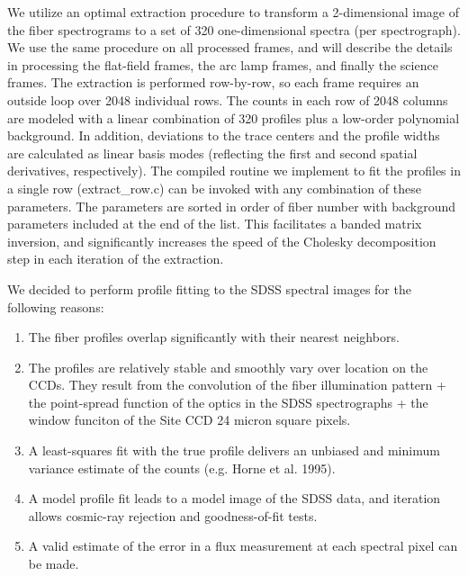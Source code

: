 \documentclass[12pt,preprint]{aastex}
\begin{document}
We utilize an optimal extraction procedure to transform a 2-dimensional image of
the fiber spectrograms to a set of 320 one-dimensional spectra 
(per spectrograph).  We use the same procedure on all processed frames, 
and will describe the details in processing the flat-field frames, the
arc lamp frames, and finally the science frames.  
The extraction is performed row-by-row, so each frame requires an 
outside loop over 2048 individual rows.
The counts in each row of 2048 columns are modeled with a linear 
combination of 320 profiles plus a low-order
polynomial background.  In addition, deviations to the trace centers and
the profile widths are calculated as linear basis modes (reflecting the first
and second spatial derivatives, respectively).  The compiled routine
we implement to fit the profiles in a single row (extract\_row.c) can
be invoked with any combination of these parameters.  The parameters are
sorted in order of fiber number with background parameters included at the
end of the list.  This facilitates a banded matrix inversion, and 
significantly increases the speed of the Cholesky decomposition step in each
iteration of the extraction.

We decided to perform profile fitting to the 
SDSS spectral images for the following reasons:  

\begin{enumerate}

\item{The fiber profiles overlap significantly with their nearest neighbors.}

\item{The profiles are relatively stable and smoothly vary over 
location on the CCDs.  They result from the convolution of the fiber 
illumination pattern + the point-spread function
of the optics in the SDSS spectrographs + the window funciton of the 
Site CCD 24 micron square pixels. }

\item{A least-squares fit with the true profile delivers an 
unbiased and minimum variance estimate of the counts (e.g. Horne et al. 1995).}

\item{A model profile fit leads to a model image of the SDSS data,
and iteration allows cosmic-ray rejection and goodness-of-fit tests.}

\item{A valid estimate of the error in a flux measurement at 
each spectral pixel can be made.}

\end{enumerate}
\end{document}
